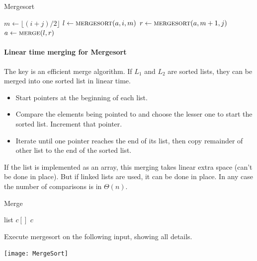 \begin{algorithm}[H]
  \caption{Mergesort
    \label{alg:mergesort}}
\begin{algorithmic}[0]
\State $m \gets \lfloor (i + j)/2 \rfloor$ 
\State $l \gets \Call{mergesort}{a,i,m}$ 
\State $r \gets  \Call{mergesort}{a,m+1,j}$ 
\State $a \gets  \Call{merge}{l, r}$ 
\EndIf
\State {}
\EndFunction  
\end{algorithmic}
\end{algorithm}

\paragraph{Linear time merging for Mergesort}
The key is an efficient merge algorithm. 
If $L_1$ and $L_2$ are sorted lists, they can be merged into one sorted 
list in linear time.
\begin{itemize}
\item Start pointers at the beginning of each list. 
\item Compare the elements being pointed 
to and choose the lesser one to start the sorted list. Increment that pointer. 
\item Iterate until one pointer reaches the end of its list, then 
copy remainder of other list to the end of the sorted list.
\end{itemize} 
If the list is implemented as an array, this merging takes linear extra 
space (can't be done in place). But if linked lists are used, it can be done in 
place. In any case the number of comparisons is in $\Theta(n)$.


\begin{algorithm}[H]
  \caption{Merge}
    \label{alg:merge}
\begin{algorithmic}[0]
	\State list $c[]$
			\State \Return $c$
		\EndIf
 	\EndWhile
\EndFunction  
\end{algorithmic}
\end{algorithm}
\fi
\begin{Boxample}[0]
Execute mergesort on the following input, showing all details.
\begin{center}
\texttt{[image: MergeSort]} 
\end{center}
\end{Boxample}

